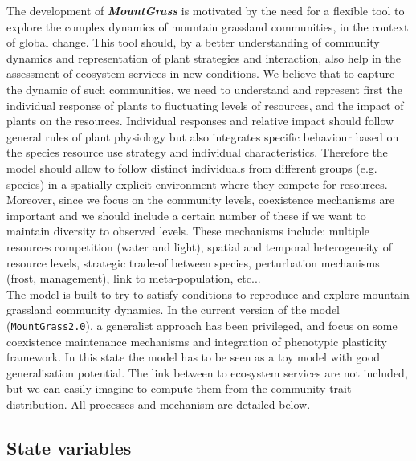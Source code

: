 \documentclass[a4paper,twoside, justified,marginals=raggedright]{tufte-handout}
\newcommand{\model}{\textit{\textbf{MountGrass }}}
\newcommand{\version}{\texttt{MountGrass2.0}}
\begin{document}
The development of \model is motivated by the need for a flexible tool to explore the complex dynamics of mountain grassland communities, in the context of global change. This tool should, by a better understanding of community dynamics and representation of plant strategies and interaction, also help in the assessment of ecosystem services in new conditions. We believe that to capture the dynamic of such communities, we need to understand and represent first the individual response of plants  to fluctuating levels of resources, and the impact of plants on the resources. Individual responses and relative impact should follow general rules of plant physiology but also integrates specific behaviour based on the species resource use strategy and individual characteristics. Therefore the model should allow to follow distinct individuals from different groups (e.g. species) in a spatially explicit environment where they compete for resources.\\
\indent Moreover, since we focus on the community levels, coexistence mechanisms are important and we should include a certain number of these if we want to maintain diversity to observed levels. These mechanisms include: multiple resources competition (water and light), spatial and temporal heterogeneity of resource levels, strategic trade-of between species, perturbation mechanisms (frost, management), link  to meta-population, etc...\\
\indent The model is built to try to satisfy conditions to reproduce and explore mountain grassland community dynamics. In the current version of the model (\version), a generalist approach has been privileged, and focus on some coexistence maintenance mechanisms and integration of phenotypic plasticity framework. In this state the model has to be seen as a toy model with good generalisation potential. The link between to ecosystem services are not included, but we can easily imagine to compute them from the community trait distribution. All processes and mechanism are detailed below.


\subsection{State variables}
\end{document}
